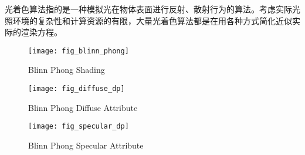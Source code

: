 光着色算法指的是一种模拟光在物体表面进行反射、散射行为的算法。考虑实际光照环境的复杂性和计算资源的有限，大量光着色算法都是在用各种方式简化近似实际的渲染方程。

\begin{figure}
    \centering
    \texttt{[image: fig\_blinn\_phong]}
    \caption{Blinn Phong Shading}
    \label{fig:blinn_phong}
\end{figure}

\begin{figure}
    \centering
    \texttt{[image: fig\_diffuse\_dp]}
    \caption{Blinn Phong Diffuse Attribute}
    \label{fig:blinn_phong_diffuse}
\end{figure}

\begin{figure}
    \centering
    \texttt{[image: fig\_specular\_dp]}
    \caption{Blinn Phong Specular Attribute}
    \label{fig:blinn_phong_specular}
\end{figure}
